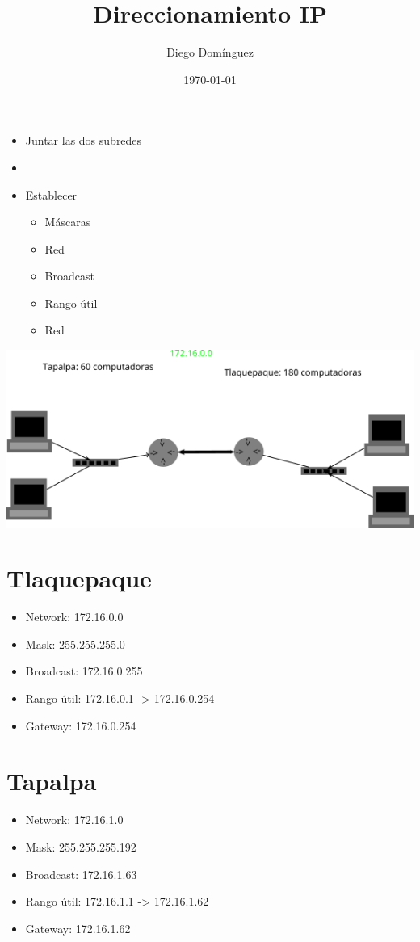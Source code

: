 \documentclass[11pt]{article}
\author{Diego Domínguez}
\date{\today}
\title{Direccionamiento IP}
\begin{document}
\maketitle
\tableofcontents

\begin{itemize}
\item Juntar las dos subredes
\item 

\item Establecer
\begin{itemize}
\item Máscaras
\item Red
\item Broadcast
\item Rango útil
\item Red
\end{itemize}
\end{itemize}


\begin{center}
\includegraphics[width=.9\linewidth]{./ejercicio.png}
\end{center}


\section{Tlaquepaque}
\label{sec:org76f7239}
\begin{itemize}
\item Network: 172.16.0.0
\item Mask: 255.255.255.0
\item Broadcast: 172.16.0.255
\item Rango útil: 172.16.0.1 -> 172.16.0.254
\item Gateway: 172.16.0.254
\end{itemize}

\section{Tapalpa}
\label{sec:org0fdda6a}
\begin{itemize}
\item Network: 172.16.1.0
\item Mask: 255.255.255.192
\item Broadcast: 172.16.1.63
\item Rango útil: 172.16.1.1 -> 172.16.1.62
\item Gateway: 172.16.1.62
\end{itemize}
\end{document}
